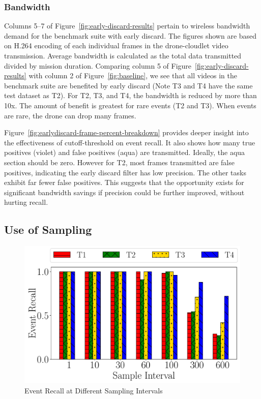 \subsubsection{Bandwidth}
Columns 5--7 of Figure~\ref{fig:early-discard-results} pertain to wireless
bandwidth demand for the benchmark suite with early discard.  The figures shown
are based on H.264 encoding of each individual frames in the drone-cloudlet
video transmission. Average bandwidth is calculated as the total data
transmitted divided by mission duration.  Comparing column 5 of
Figure~\ref{fig:early-discard-results} with column 2 of
Figure~\ref{fig:baseline}, we see that all videos in the benchmark suite are
benefited by early discard (Note T3 and T4 have the same test dataset as T2).
For T2, T3, and T4, the bandwidth is reduced by more than 10x. The amount of
benefit is greatest for rare events (T2 and T3).  When events are rare, the
drone can drop many frames.

Figure~\ref{fig:earlydiscard-frame-percent-breakdown} provides deeper insight
into the effectiveness of cutoff-threshold on event recall. It also shows how
many true positives (violet) and false positives (aqua) are
transmitted. Ideally, the aqua section should be zero.  However for T2, most
frames transmitted are false positives, indicating the early discard filter has
low precision.  The other tasks exhibit far fewer false positives.  This
suggests that the opportunity exists for significant bandwidth savings if
precision could be further improved, without hurting recall.

\subsection{Use of Sampling}

\begin{figure}[h]
    \centering
    \includegraphics[width=.7\linewidth]{FIGS/fig-random-select-interval-recall-hatch.pdf}
\caption{Event Recall at Different Sampling Intervals}
\label{fig:sampling-only}
\end{figure}


